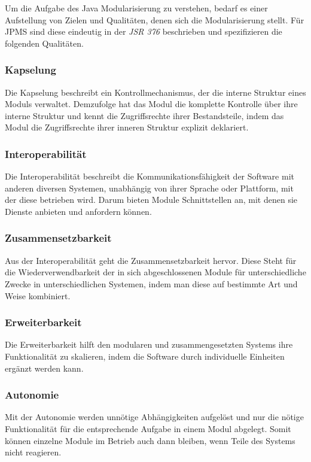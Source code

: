     Um die Aufgabe des Java Modularisierung zu verstehen, bedarf es einer Aufstellung von Zielen und Qualitäten, denen sich die Modularisierung stellt. Für JPMS sind diese eindeutig in der \textit{JSR 376} \cite{jmsOracle,java9modRevealed} beschrieben und spezifizieren die folgenden Qualitäten.

    \subsubsection{Kapselung}
      Die Kapselung beschreibt ein Kontrollmechanismus, der die interne Struktur eines Moduls verwaltet. Demzufolge hat das Modul die komplette Kontrolle über ihre interne Struktur und kennt die Zugriffsrechte ihrer Bestandsteile, indem das Modul die Zugriffsrechte ihrer inneren Struktur explizit deklariert.

    \subsubsection{Interoperabilität}
      Die Interoperabilität beschreibt die Kommunikationsfähigkeit der Software mit anderen diversen Systemen, unabhängig von ihrer Sprache oder Plattform, mit der diese betrieben wird. Darum bieten Module Schnittstellen an, mit denen sie Dienste anbieten und anfordern können.

    \subsubsection{Zusammensetzbarkeit}
      Aus der Interoperabilität geht die Zusammensetzbarkeit hervor. Diese Steht für die Wiederverwendbarkeit der in sich abgeschlossenen Module für unterschiedliche Zwecke in unterschiedlichen Systemen, indem man diese auf bestimmte Art und Weise kombiniert. 

    \subsubsection{Erweiterbarkeit}
     Die Erweiterbarkeit hilft den modularen und zusammengesetzten Systems ihre Funktionalität zu skalieren, indem die Software durch individuelle Einheiten ergänzt werden kann. 

    \subsubsection{Autonomie}
      Mit der Autonomie werden unnötige Abhängigkeiten aufgelöst und nur die nötige Funktionalität für die entsprechende Aufgabe in einem Modul abgelegt. Somit können einzelne Module im Betrieb auch dann bleiben, wenn Teile des Systems nicht reagieren.

